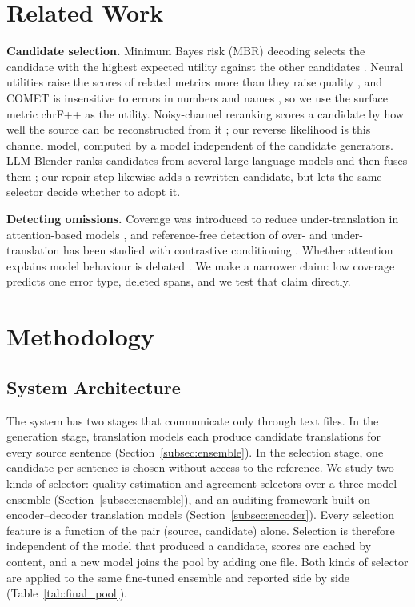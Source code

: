 \documentclass[11pt]{article}
\begin{document}
\section{Related Work}
\label{sec:related_work}
\textbf{Candidate selection.} Minimum Bayes risk (MBR) decoding selects the candidate with the highest expected utility against the other candidates \citep{freitag-etal-2022-high}. Neural utilities raise the scores of related metrics more than they raise quality \citep{kovacs-etal-2024-mitigating}, and COMET is insensitive to errors in numbers and names \citep{amrhein-sennrich-2022-identifying}, so we use the surface metric chrF++ \citep{popovic-2017-chrf} as the utility. Noisy-channel reranking scores a candidate by how well the source can be reconstructed from it \citep{yee-etal-2019-simple}; our reverse likelihood is this channel model, computed by a model independent of the candidate generators. LLM-Blender ranks candidates from several large language models and then fuses them \citep{jiang-etal-2023-llm}; our repair step likewise adds a rewritten candidate, but lets the same selector decide whether to adopt it.

\textbf{Detecting omissions.} Coverage was introduced to reduce under-translation in attention-based models \citep{tu-etal-2016-modeling}, and reference-free detection of over- and under-translation has been studied with contrastive conditioning \citep{vamvas-sennrich-2022-little}. Whether attention explains model behaviour is debated \citep{jain-wallace-2019-attention}. We make a narrower claim: low coverage predicts one error type, deleted spans, and we test that claim directly.

\section{Methodology}
\label{sec:methodology}

\subsection{System Architecture}
\label{subsec:system_architecture}
The system has two stages that communicate only through text files. In the generation stage, translation models each produce candidate translations for every source sentence (Section~\ref{subsec:ensemble}). In the selection stage, one candidate per sentence is chosen without access to the reference. We study two kinds of selector: quality-estimation and agreement selectors over a three-model ensemble (Section~\ref{subsec:ensemble}), and an auditing framework built on encoder--decoder translation models (Section~\ref{subsec:encoder}). Every selection feature is a function of the pair (source, candidate) alone. Selection is therefore independent of the model that produced a candidate, scores are cached by content, and a new model joins the pool by adding one file. Both kinds of selector are applied to the same fine-tuned ensemble and reported side by side (Table~\ref{tab:final_pool}).
\end{document}
